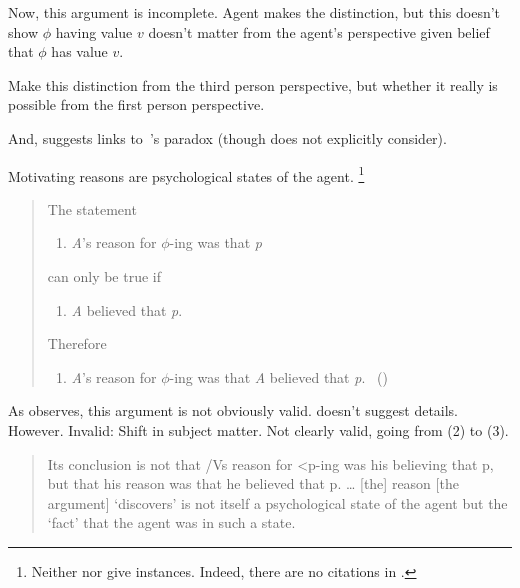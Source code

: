 \begin{note}
  Now, this argument is incomplete.
  Agent makes the distinction, but this doesn't show \(\phi\) having value \(v\) doesn't matter from the agent's perspective given belief that \(\phi\) has value \(v\).

  Make this distinction from the third person perspective, but whether it really is possible from the first person perspective.

  And, \citeauthor{Dancy:2000aa} suggests links to~\citeauthor{Moore:1993wk}'s paradox (though \citeauthor{Collins:1997wn} does not explicitly consider).
\end{note}

\begin{note}
  Motivating reasons are psychological states of the agent.
  \citeauthor{Dancy:2000aa}%
  \footnote{
    Neither \citeauthor{Dancy:2000aa} nor \citeauthor{Collins:1997wn} give instances.
    Indeed, there are no citations in \textcite{Collins:1997wn}.
  }

  \begin{quote}
    The statement
    \begin{enumerate}[label=(\arabic*), ref=(\arabic*), nosep]
    \item%
      \emph{A}'s reason for \(\phi\)-ing was that \emph{p}
    \end{enumerate}
    can only be true if
    \begin{enumerate}[label=(\arabic*), ref=(\arabic*), resume, nosep]
    \item
      \emph{A} believed that \emph{p}.
    \end{enumerate}
    Therefore
    \begin{enumerate}[label=(\arabic*), ref=(\arabic*), resume, nosep]
    \item
      \emph{A}'s reason for \(\phi\)-ing was that \emph{A} believed that \emph{p}.%
      \mbox{ }\hfill\mbox{(\citeyear[102]{Dancy:2000aa})}
    \end{enumerate}
  \end{quote}

  As \citeauthor{Dancy:2000aa} observes, this argument is not obviously valid.
  \citeauthor{Dancy:2000aa} doesn't suggest details.
  However.
  Invalid: Shift in subject matter.
  Not clearly valid, going from (2) to (3).

  \begin{quote}
    Its conclusion is not that /Vs reason for <p-ing was his believing that p, but that his reason was that he believed that p.
    \dots
    [the] reason [the argument] `discovers' is not itself a psychological state of the agent but the `fact' that the agent was in such a state.
  \end{quote}


\end{note}
